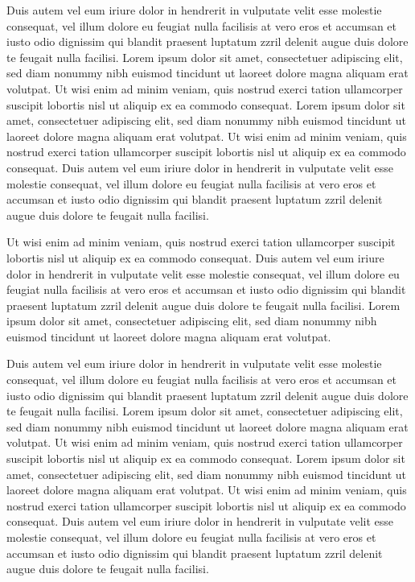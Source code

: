 \documentclass[oldfontcommands,6x9]{pupbook}
\begin{document}
\begin{thepreface}
Duis autem vel eum iriure dolor in hendrerit in vulputate velit esse
molestie consequat, vel illum dolore eu feugiat nulla facilisis at vero
eros et accumsan et iusto odio dignissim qui blandit praesent luptatum
zzril delenit augue duis dolore te feugait nulla facilisi. Lorem ipsum
dolor sit amet, consectetuer adipiscing elit, sed diam nonummy nibh
euismod tincidunt ut laoreet dolore magna aliquam erat volutpat. Ut wisi
enim ad minim veniam, quis nostrud exerci tation ullamcorper suscipit
lobortis nisl ut aliquip ex ea commodo consequat. 
Lorem ipsum dolor sit amet, consectetuer adipiscing elit, sed diam
nonummy nibh euismod tincidunt ut laoreet dolore magna aliquam erat
volutpat. Ut wisi enim ad minim veniam, quis nostrud exerci tation
ullamcorper suscipit lobortis nisl ut aliquip ex ea commodo consequat.
Duis autem vel eum iriure dolor in hendrerit in vulputate velit esse
molestie consequat, vel illum dolore eu feugiat nulla facilisis at vero
eros et accumsan et iusto odio dignissim qui blandit praesent luptatum
zzril delenit augue duis dolore te feugait nulla facilisi. 

Ut wisi enim ad minim veniam, quis nostrud exerci tation ullamcorper
suscipit lobortis nisl ut aliquip ex ea commodo consequat. Duis autem
vel eum iriure dolor in hendrerit in vulputate velit esse molestie
consequat, vel illum dolore eu feugiat nulla facilisis at vero eros et
accumsan et iusto odio dignissim qui blandit praesent luptatum zzril
delenit augue duis dolore te feugait nulla facilisi. Lorem ipsum dolor
sit amet, consectetuer adipiscing elit, sed diam nonummy nibh euismod
tincidunt ut laoreet dolore magna aliquam erat volutpat. 

Duis autem vel eum iriure dolor in hendrerit in vulputate velit esse
molestie consequat, vel illum dolore eu feugiat nulla facilisis at vero
eros et accumsan et iusto odio dignissim qui blandit praesent luptatum
zzril delenit augue duis dolore te feugait nulla facilisi. Lorem ipsum
dolor sit amet, consectetuer adipiscing elit, sed diam nonummy nibh
euismod tincidunt ut laoreet dolore magna aliquam erat volutpat. Ut wisi
enim ad minim veniam, quis nostrud exerci tation ullamcorper suscipit
lobortis nisl ut aliquip ex ea commodo consequat. 
Lorem ipsum dolor sit amet, consectetuer adipiscing elit, sed diam
nonummy nibh euismod tincidunt ut laoreet dolore magna aliquam erat
volutpat. Ut wisi enim ad minim veniam, quis nostrud exerci tation
ullamcorper suscipit lobortis nisl ut aliquip ex ea commodo consequat.
Duis autem vel eum iriure dolor in hendrerit in vulputate velit esse
molestie consequat, vel illum dolore eu feugiat nulla facilisis at vero
eros et accumsan et iusto odio dignissim qui blandit praesent luptatum
zzril delenit augue duis dolore te feugait nulla facilisi. 


\end{thepreface}
\end{document}
